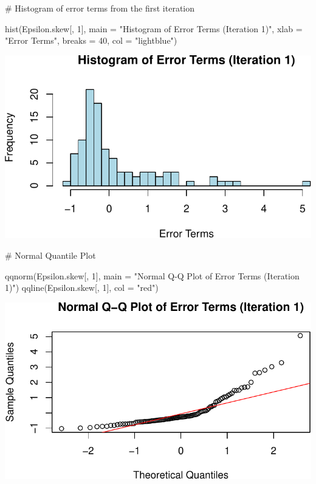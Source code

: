 \documentclass[
  11pt,
]{article}
\newenvironment{Shaded}{\begin{snugshade}}{\end{snugshade}}
\newcommand{\AttributeTok}[1]{\textcolor[rgb]{0.40,0.45,0.13}{#1}}
\newcommand{\CommentTok}[1]{\textcolor[rgb]{0.37,0.37,0.37}{#1}}
\newcommand{\DecValTok}[1]{\textcolor[rgb]{0.68,0.00,0.00}{#1}}
\newcommand{\FunctionTok}[1]{\textcolor[rgb]{0.28,0.35,0.67}{#1}}
\newcommand{\NormalTok}[1]{\textcolor[rgb]{0.00,0.23,0.31}{#1}}
\newcommand{\StringTok}[1]{\textcolor[rgb]{0.13,0.47,0.30}{#1}}
\begin{document}
\begin{Shaded}
\begin{Highlighting}[]
\CommentTok{\# Histogram of error terms from the first iteration}

\FunctionTok{hist}\NormalTok{(Epsilon.skew[, }\DecValTok{1}\NormalTok{], }
     \AttributeTok{main =} \StringTok{"Histogram of Error Terms (Iteration 1)"}\NormalTok{,}
     \AttributeTok{xlab =} \StringTok{"Error Terms"}\NormalTok{, }\AttributeTok{breaks =} \DecValTok{40}\NormalTok{, }\AttributeTok{col =} \StringTok{"lightblue"}\NormalTok{)}
\end{Highlighting}
\end{Shaded}

\includegraphics{HW-4-CODE-and-ANSWERS_files/figure-pdf/unnamed-chunk-11-1.pdf}

\begin{Shaded}
\begin{Highlighting}[]
\CommentTok{\# Normal Quantile Plot}

\FunctionTok{qqnorm}\NormalTok{(Epsilon.skew[, }\DecValTok{1}\NormalTok{], }
       \AttributeTok{main =} \StringTok{"Normal Q{-}Q Plot of Error Terms (Iteration 1)"}\NormalTok{)}
\FunctionTok{qqline}\NormalTok{(Epsilon.skew[, }\DecValTok{1}\NormalTok{], }\AttributeTok{col =} \StringTok{"red"}\NormalTok{)}
\end{Highlighting}
\end{Shaded}

\includegraphics{HW-4-CODE-and-ANSWERS_files/figure-pdf/unnamed-chunk-11-2.pdf}
\end{document}

